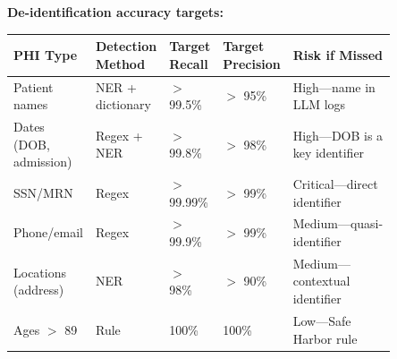 \textbf{De-identification accuracy targets:}

\begin{tabular}{|p{0.15\linewidth}|p{0.15\linewidth}|p{0.1\linewidth}|p{0.1\linewidth}|p{0.35\linewidth}|}
\hline
\textbf{PHI Type} & \textbf{Detection Method} & \textbf{Target Recall} & \textbf{Target Precision} & \textbf{Risk if Missed} \\
\hline
Patient names & NER + dictionary & $>$ 99.5\% & $>$ 95\% & High---name in LLM logs \\
\hline
Dates (DOB, admission) & Regex + NER & $>$ 99.8\% & $>$ 98\% & High---DOB is a key identifier \\
\hline
SSN/MRN & Regex & $>$ 99.99\% & $>$ 99\% & Critical---direct identifier \\
\hline
Phone/email & Regex & $>$ 99.9\% & $>$ 99\% & Medium---quasi-identifier \\
\hline
Locations (address) & NER & $>$ 98\% & $>$ 90\% & Medium---contextual identifier \\
\hline
Ages $>$ 89 & Rule & 100\% & 100\% & Low---Safe Harbor rule \\
\hline
\end{tabular}

